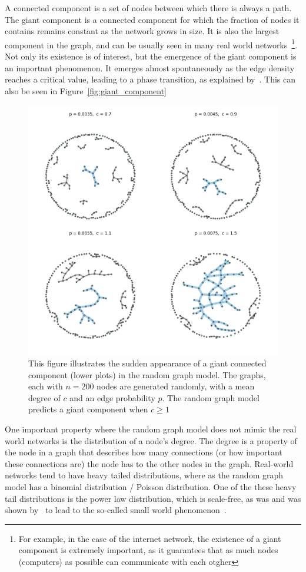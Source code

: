 \documentclass[12pt,beltcrest]{ociamthesis} %
\begin{document}
A connected component is a set of nodes between which there is always a path.
The giant component is a connected component for which the fraction of nodes it contains remains constant as the network grows in size.
It is also the largest component in the graph, and can be usually seen in many real world networks~\footnote{For example, in the case of the internet network, the existence of a giant component is extremely important, as it guarantees that as much nodes (computers) as possible can communicate with each otgher}.
Not only its existence is of interest, but the emergence of the giant component is an important phenomenon.
It emerges almost spontaneously as the edge density reaches a critical value, leading to a phase transition, as explained by~\cite{newman2002random}.
This can also be seen in Figure~\vref{fig:giant_component}
\begin{figure}[tb]
	\centering
	\includegraphics[width=13cm]{figures/giant_component.png}
	\caption{This figure illustrates the sudden appearance of a giant connected component (lower plots) in the random graph model. The graphs, each with $n=200$ nodes are generated randomly, with a mean degree of $c$ and an edge probability $p$. The random graph model predicts a giant component when $c\ge1$}
	\label{fig:giant_component}
\end{figure}

One important property where the random graph model does not mimic the real world networks is the distribution of a node's degree.
The degree is a property of the node in a graph that describes how many connections (or how important these connections are) the node has to the other nodes in the graph.
Real-world networks tend to have heavy tailed distributions, where as the random graph model has a binomial distribution / Poisson distribution.
One of the these heavy tail distributions is the power law distribution, which is scale-free, as was and was shown by~\cite{Albert:2002p4071} to lead to the so-called small world phenomenon~\cite{Watts:1998db}.
\end{document}

